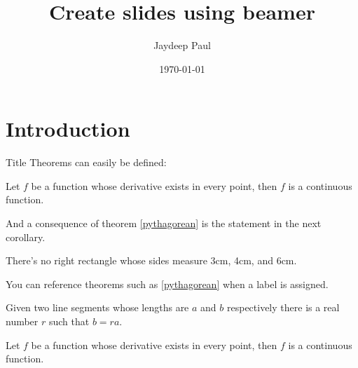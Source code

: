 \documentclass[aspectratio=169]{beamer}
\title{Create slides using beamer}
\author{Jaydeep Paul}
\date{\today}
\begin{document}
\maketitle
\begin{frame}
\tableofcontents
\end{frame}
\section{Introduction}
\begin{frame}[t]{Title}
Theorems can easily be defined:

\begin{theorem}
Let \(f\) be a function whose derivative exists in every point, then \(f\) is a continuous function.
\end{theorem}

\end{frame}

\begin{frame}
And a consequence of theorem \ref{pythagorean} is the statement in the next 
corollary.

\begin{corollary}
There's no right rectangle whose sides measure 3cm, 4cm, and 6cm.
\end{corollary}

You can reference theorems such as \ref{pythagorean} when a label is assigned.

\begin{lemma}
Given two line segments whose lengths are \(a\) and \(b\) respectively there is a 
real number \(r\) such that \(b=ra\).
\end{lemma}

\begin{theorem}
Let \(f\) be a function whose derivative exists in every point, then \(f\) is a continuous function.
\end{theorem}
\end{frame}

\begin{frame}

\end{frame}
\end{document}
